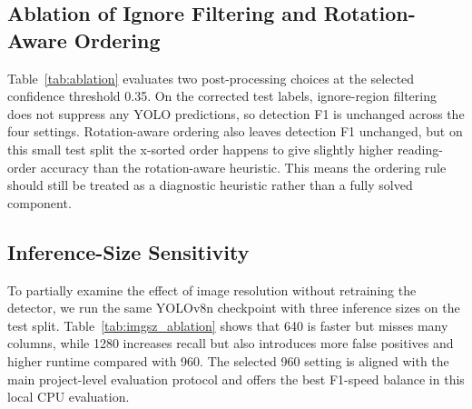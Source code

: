 \documentclass[12pt]{article}
\begin{document}
\subsection{Ablation of Ignore Filtering and Rotation-Aware Ordering}
Table~\ref{tab:ablation} evaluates two post-processing choices at the selected confidence threshold 0.35. On the corrected test labels, ignore-region filtering does not suppress any YOLO predictions, so detection F1 is unchanged across the four settings. Rotation-aware ordering also leaves detection F1 unchanged, but on this small test split the x-sorted order happens to give slightly higher reading-order accuracy than the rotation-aware heuristic. This means the ordering rule should still be treated as a diagnostic heuristic rather than a fully solved component.

\begin{table}[t]
\centering
\caption{Ablation of ignore-region filtering and rotation-aware reading order at score threshold 0.35. Removed denotes predictions suppressed because they overlap an Ignore region.}
\label{tab:ablation}
\end{table}


\subsection{Inference-Size Sensitivity}
To partially examine the effect of image resolution without retraining the detector, we run the same YOLOv8n checkpoint with three inference sizes on the test split. Table~\ref{tab:imgsz_ablation} shows that 640 is faster but misses many columns, while 1280 increases recall but also introduces more false positives and higher runtime compared with 960. The selected 960 setting is aligned with the main project-level evaluation protocol and offers the best F1-speed balance in this local CPU evaluation.
\end{document}
